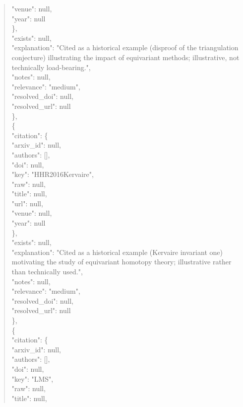 \documentclass[11pt]{article}
\begin{document}
\begin{quote}
        "venue": null,\\
        "year": null\\
      \},\\
      "exists": null,\\
      "explanation": "Cited as a historical example (disproof of the triangulation conjecture) illustrating the impact of equivariant methods; illustrative, not technically load-bearing.",\\
      "notes": null,\\
      "relevance": "medium",\\
      "resolved\_doi": null,\\
      "resolved\_url": null\\
    \},\\
    \{\\
      "citation": \{\\
        "arxiv\_id": null,\\
        "authors": [],\\
        "doi": null,\\
        "key": "HHR2016Kervaire",\\
        "raw": null,\\
        "title": null,\\
        "url": null,\\
        "venue": null,\\
        "year": null\\
      \},\\
      "exists": null,\\
      "explanation": "Cited as a historical example (Kervaire invariant one) motivating the study of equivariant homotopy theory; illustrative rather than technically used.",\\
      "notes": null,\\
      "relevance": "medium",\\
      "resolved\_doi": null,\\
      "resolved\_url": null\\
    \},\\
    \{\\
      "citation": \{\\
        "arxiv\_id": null,\\
        "authors": [],\\
        "doi": null,\\
        "key": "LMS",\\
        "raw": null,\\
        "title": null,\\

\end{quote}
\end{document}
